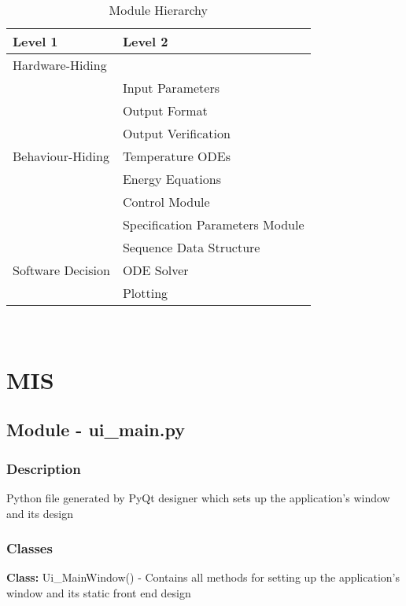 \documentclass[12pt, titlepage]{article}
\begin{document}
\begin{table}[h!]
\centering
\begin{tabular}{p{} p{}}
\toprule
\textbf{Level 1} & \textbf{Level 2}\\
\midrule

{Hardware-Hiding} & ~ \\
\midrule

\multirow{7}{0.3\textwidth}{Behaviour-Hiding} & Input Parameters\\
& Output Format\\
& Output Verification\\
& Temperature ODEs\\
& Energy Equations\\ 
& Control Module\\
& Specification Parameters Module\\
\midrule

\multirow{3}{0.3\textwidth}{Software Decision} & {Sequence Data Structure}\\
& ODE Solver\\
& Plotting\\
\bottomrule

\end{tabular}
\caption{Module Hierarchy}
\label{TblMH}
\end{table}

\newpage
~\newpage

\section{MIS } \label{Module} 



  \subsection{Module - ui\_main.py}

  \subsubsection{Description}
  Python file generated by PyQt designer which sets up the application’s window and its design

  \subsubsection{Classes}
  \textbf{Class:} Ui\_MainWindow() - Contains all methods for setting up the application’s window and its static front end design \\
\end{document}
